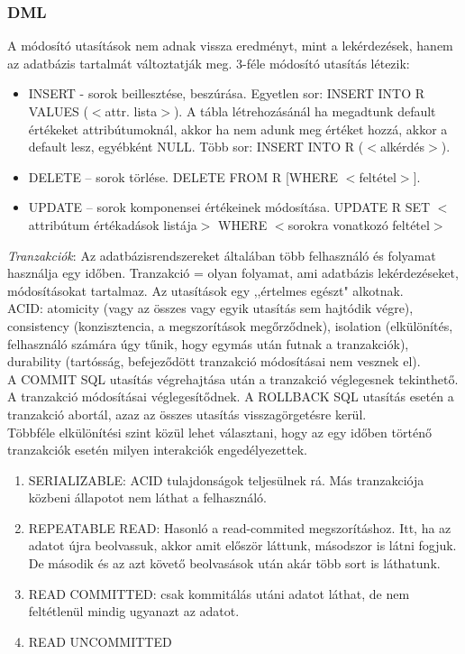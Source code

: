 \documentclass[margin=0px]{article}
\begin{document}
\subsubsection{DML}

A módosító utasítások nem adnak vissza eredményt, mint a lekérdezések, hanem az adatbázis tartalmát változtatják meg. 3-féle módosító utasítás létezik:
\begin{itemize}
    \item INSERT - sorok beillesztése, beszúrása. Egyetlen sor: INSERT INTO R VALUES ($<$attr. lista$>$). A tábla létrehozásánál ha megadtunk default értékeket attribútumoknál, akkor ha nem adunk meg értéket hozzá, akkor a default lesz, egyébként NULL. Több sor: INSERT INTO R ($<$alkérdés$>$).
    \item DELETE – sorok törlése. DELETE FROM R [WHERE $<$feltétel$>$].
    \item UPDATE – sorok komponensei értékeinek módosítása. UPDATE R SET $<$attribútum értékadások listája$>$ WHERE $<$sorokra vonatkozó feltétel$>$
\end{itemize}
\textit{Tranzakciók}: Az adatbázisrendszereket általában több felhasználó és folyamat használja egy időben. Tranzakció = olyan folyamat, ami adatbázis lekérdezéseket, módosításokat tartalmaz. Az utasítások egy ,,értelmes egészt" alkotnak. \\
ACID: atomicity (vagy az összes vagy egyik utasítás sem hajtódik végre), consistency (konzisztencia, a megszorítások megőrződnek), isolation (elkülönítés, felhasználó számára úgy tűnik, hogy egymás után futnak a tranzakciók), durability (tartósság, befejeződött tranzakció módosításai nem vesznek el). \\
A COMMIT SQL utasítás végrehajtása után a tranzakció véglegesnek tekinthető. A tranzakció módosításai véglegesítődnek. A ROLLBACK SQL utasítás esetén a tranzakció abortál, azaz az összes utasítás visszagörgetésre kerül. \\
Többféle elkülönítési szint közül lehet választani, hogy az egy időben történő tranzakciók esetén milyen interakciók engedélyezettek.
\begin{enumerate}
    \item SERIALIZABLE: ACID tulajdonságok teljesülnek rá. Más tranzakciója közbeni állapotot nem láthat a felhasználó.
    \item REPEATABLE READ: Hasonló a read-commited megszorításhoz. Itt, ha az adatot újra beolvassuk, akkor amit először láttunk, másodszor is látni fogjuk. De második és az azt követő beolvasások után akár több sort is láthatunk.
    \item READ COMMITTED: csak kommitálás utáni adatot láthat, de nem feltétlenül mindig ugyanazt az adatot.
    \item READ UNCOMMITTED
\end{enumerate}
\end{document}
